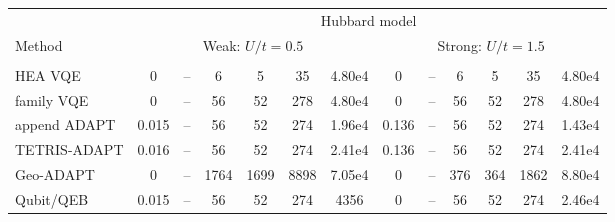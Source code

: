\documentclass[
  reprint,
  amsmath,
  amssymb,
  aps,
  pra,
  nofootinbib,
  superscriptaddress,
  floatfix
]{revtex4-2}
\newcommand{\metrichead}[1]{\makebox[0.061\textwidth][c]{#1}}
\begin{document}
\begin{widetext}
\begin{minipage}{\textwidth}
\begin{center}
\footnotesize
\setlength{\tabcolsep}{1.15pt}
\renewcommand{\arraystretch}{1.08}
\begin{ruledtabular}
\begin{tabular}{p{}cccccc|cccccc}
& \multicolumn{12}{c}{Hubbard model}\\
\cline{2-13}
Method & \multicolumn{6}{c|}{Weak: $U/t=0.5$} & \multicolumn{6}{c}{Strong: $U/t=1.5$}\\
\cline{2-7}\cline{8-13}
 & \metrichead{$\delta E$} & \metrichead{$1-F$} & \metrichead{$N_{2q}$} & \metrichead{$D_{2q}$} & \metrichead{$D_c$} & \metrichead{$S$} & \metrichead{$\delta E$} & \metrichead{$1-F$} & \metrichead{$N_{2q}$} & \metrichead{$D_{2q}$} & \metrichead{$D_c$} & \metrichead{$S$}\\
\colrule
HEA VQE & 0 & -- & 6 & 5 & 35 & 4.80e4 & 0 & -- & 6 & 5 & 35 & 4.80e4\\
family VQE & 0 & -- & 56 & 52 & 278 & 4.80e4 & 0 & -- & 56 & 52 & 278 & 4.80e4\\
append ADAPT & 0.015 & -- & 56 & 52 & 274 & 1.96e4 & 0.136 & -- & 56 & 52 & 274 & 1.43e4\\
TETRIS-ADAPT & 0.016 & -- & 56 & 52 & 274 & 2.41e4 & 0.136 & -- & 56 & 52 & 274 & 2.41e4\\
Geo-ADAPT & 0 & -- & 1764 & 1699 & 8898 & 7.05e4 & 0 & -- & 376 & 364 & 1862 & 8.80e4\\
Qubit/QEB & 0.015 & -- & 56 & 52 & 274 & 4356 & 0 & -- & 56 & 52 & 274 & 2.46e4\\

\end{tabular}
\end{ruledtabular}
\end{center}
\end{minipage}
\end{widetext}
\end{document}

